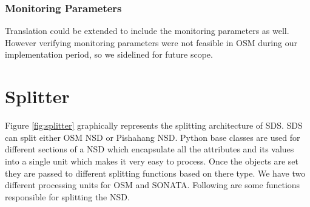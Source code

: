 \subsubsection{Monitoring Parameters}
Translation could be extended to include the monitoring parameters as well. However verifying monitoring parameters were not feasible in OSM during our implementation period, so we sidelined for future scope.

\newpage

\section{Splitter}
Figure \ref{fig:splitter} graphically represents the splitting architecture of SDS. SDS can split either OSM NSD or Pishahang NSD. Python base classes are used for different sections of a NSD which encapsulate all the attributes and its values into a single unit which makes it very easy to process. Once the objects are set they are passed to different splitting functions based on there type. We have two different processing units for OSM and SONATA. Following are some functions responsible for splitting the NSD.

